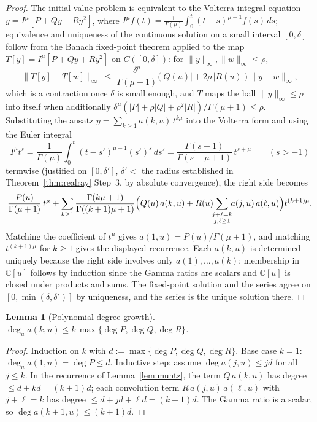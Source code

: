 \documentclass[11pt]{article}
\newtheorem{lemma}[theorem]{Lemma}
\theoremstyle{definition}
\begin{document}
\begin{proof}
The initial-value problem is equivalent to the Volterra integral
equation $y = I^{\mu}[P + Qy + Ry^{2}]$, where
$I^{\mu} f(t) = \frac{1}{\Gamma(\mu)} \int_{0}^{t} (t-s)^{\mu-1} f(s)\,
ds$; equivalence and uniqueness of the continuous solution on a
small interval $[0,\delta]$ follow from the Banach fixed-point theorem
applied to the map $T[y] = I^{\mu}[P+Qy+Ry^{2}]$ on
$C([0,\delta])$: for $\|y\|_{\infty},\|w\|_{\infty} \leq \rho$,
\[
\|T[y]-T[w]\|_{\infty}
\;\leq\; \frac{\delta^{\mu}}{\Gamma(\mu+1)}
\bigl( |Q(u)| + 2\rho\,|R(u)| \bigr)\, \|y - w\|_{\infty},
\]
which is a contraction once $\delta$ is small enough, and $T$ maps the
ball $\|y\|_{\infty}\leq\rho$ into itself when additionally
$\delta^{\mu}(|P|+\rho|Q|+\rho^{2}|R|)/\Gamma(\mu+1) \leq \rho$.
Substituting the ansatz $y = \sum_{k\geq 1} a(k,u)\, t^{k\mu}$ into
the Volterra form and using the Euler integral
\[
I^{\mu} t^{s}
= \frac{1}{\Gamma(\mu)} \int_{0}^{t} (t-s')^{\mu-1} (s')^{s}\, ds'
= \frac{\Gamma(s+1)}{\Gamma(s+\mu+1)}\, t^{s+\mu}
\qquad (s > -1)
\]
termwise (justified on $[0,\delta']$, $\delta' < $ the radius
established in Theorem~\ref{thm:realray} Step~3, by absolute
convergence), the right side becomes
\[
\frac{P(u)}{\Gamma(\mu+1)}\, t^{\mu}
+ \sum_{k\geq 1} \frac{\Gamma(k\mu+1)}{\Gamma((k+1)\mu+1)}
\Bigl( Q(u)\, a(k,u) + R(u) \!\!\sum_{\substack{j+\ell=k\\ j,\ell\geq 1}}\!\!
a(j,u)\, a(\ell,u) \Bigr) t^{(k+1)\mu}.
\]
Matching the coefficient of $t^{\mu}$ gives $a(1,u) = P(u)/\Gamma(\mu+1)$,
and matching $t^{(k+1)\mu}$ for $k \geq 1$ gives the displayed
recurrence. Each $a(k,u)$ is determined uniquely because the right side
involves only $a(1),\ldots,a(k)$; membership in $\mathbb{C}[u]$
follows by induction since the Gamma ratios are scalars and
$\mathbb{C}[u]$ is closed under products and sums. The fixed-point
solution and the series agree on $[0,\min(\delta,\delta')]$ by
uniqueness, and the series is the unique solution there.
\end{proof}

\begin{lemma}[Polynomial degree growth]\label{lem:degree}
$\deg_{u} a(k,u) \leq k\, \max\{\deg P, \deg Q, \deg R\}$.
\end{lemma}

\begin{proof}
Induction on $k$ with $d := \max\{\deg P, \deg Q, \deg R\}$. Base case
$k=1$: $\deg_{u} a(1,u) = \deg P \leq d$. Inductive step: assume
$\deg a(j,u) \leq jd$ for all $j \leq k$. In the recurrence of
Lemma~\ref{lem:muntz}, the term $Q\,a(k,u)$ has degree
$\leq d + kd = (k+1)d$; each convolution term $R\,a(j,u)\,a(\ell,u)$
with $j+\ell = k$ has degree
$\leq d + jd + \ell d = (k+1)d$. The Gamma ratio is a scalar, so
$\deg a(k+1,u) \leq (k+1)d$.
\end{proof}
\end{document}
